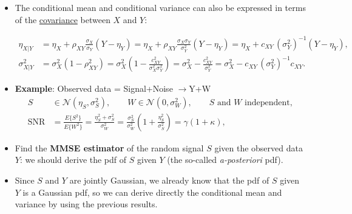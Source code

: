 \begin{itemize}
\begin{align*}
\hat{X}_{\text{MMSE}}
&= E\{X \mid Y\}
 = \eta_{X|Y}
 = \eta_X + \rho_{XY}\frac{\sigma_X}{\sigma_Y}(Y-\eta_Y). \\[8pt]
\operatorname{MSE}\{\hat{X}_{\text{MMSE}}\}
&= E_{Y,X}\!\left\{ (X-\hat{X}_{\text{MMSE}})^{2} \right\}
 = E_Y\!\left\{ E_{X|Y}\!\left[ (X-\hat{X}_{\text{MMSE}})^{2} \mid Y \right] \right\} \\[4pt]
&= E_Y\!\left\{ E_{X|Y}\!\left[ (X-\eta_{X|Y})^{2} \mid Y \right] \right\}
 = E_Y\!\left\{ \operatorname{var}\{X \mid Y\} \right\} \\[4pt]
&= E_Y\!\left\{ \sigma_{X|Y}^{2} \right\}
 = E_Y\!\left\{ \sigma_X^{2}(1-\rho_{XY}^{2}) \right\}
 = \sigma_X^{2}(1-\rho_{XY}^{2}).
\end{align*}

\item The conditional mean and conditional variance can also be expressed in terms of the \underline{covariance} between \(X\) and \(Y\):

\begin{align*}
\eta_{X|Y}
&= \eta_X + \rho_{XY}\frac{\sigma_X}{\sigma_Y}(Y-\eta_Y)
 = \eta_X + \rho_{XY}\frac{\sigma_X\sigma_Y}{\sigma_Y^{2}}(Y-\eta_Y)  = \eta_X + c_{XY}\,(\sigma_Y^{2})^{-1}(Y-\eta_Y), \\[8pt]
\sigma_{X|Y}^{2}
&= \sigma_X^{2}(1-\rho_{XY}^{2})
 = \sigma_X^{2}\!\left(1-\frac{c_{XY}^{2}}{\sigma_X^{2}\sigma_Y^{2}}\right)
 = \sigma_X^{2} - \frac{c_{XY}^{2}}{\sigma_Y^{2}} = \sigma_X^{2} - c_{XY}\,(\sigma_Y^{2})^{-1}c_{XY}.
\end{align*}

\item \textbf{Example}: Observed data = Signal+Noise \(\rightarrow\)\quad Y+W
\begin{align*}
S &\in \mathcal{N}(\eta_S,\sigma_S^{2}), \qquad
W \in \mathcal{N}(0,\sigma_W^{2}), \qquad
S \text{ and } W \text{ independent}, \\[6pt]
\operatorname{SNR}
&= \frac{E\{S^{2}\}}{E\{W^{2}\}}
 = \frac{\eta_S^{2}+\sigma_S^{2}}{\sigma_W^{2}}
 = \frac{\sigma_S^{2}}{\sigma_W^{2}}
   \left(1+\frac{\eta_S^{2}}{\sigma_S^{2}}\right)
 = \gamma (1+\kappa),
\end{align*}

\item Find the \textbf{MMSE estimator} of the random signal \(S\) given the observed data \(Y\): we should derive the pdf of \(S\) given \(Y\) (the so-called \textit{a-posteriori} pdf).
\item Since \(S\) and \(Y\) are jointly Gaussian, we already know that the pdf of \(S\) given \(Y\) is a Gaussian pdf, so we can derive directly the conditional mean and variance by using the previous results.


\end{itemize}
